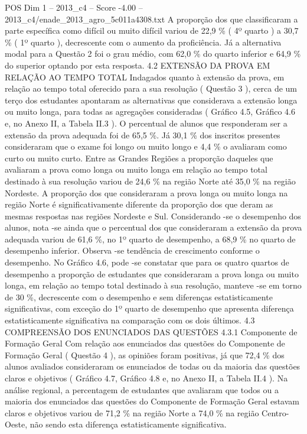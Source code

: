 \begin{textsample}{POS Dim 1 – 2013\_c4 – Score -4.00 – 2013\_c4/enade\_2013\_agro\_5c011a4308.txt}
A proporção dos que classificaram a parte específica como difícil ou muito difícil variou de 22,9 \% ( 4º quarto ) a 30,7 \% ( 1º quarto ), decrescente com o aumento da proficiência.
Já a alternativa modal para a Questão 2 foi o grau médio, com 62,0 \% do quarto inferior e 64,9 \% do superior optando por esta resposta. 4.2 EXTENSÃO DA PROVA EM RELAÇÃO AO TEMPO TOTAL Indagados quanto à extensão da prova, em relação ao tempo total oferecido para a sua resolução ( Questão 3 ), cerca de um terço dos estudantes apontaram as alternativas que considerava a extensão longa ou muito longa, para todas as agregações consideradas ( Gráfico 4.5, Gráfico 4.6 e, no Anexo II, a Tabela II.3 ).
O percentual de alunos que responderam ser a extensão da prova adequada foi de 65,5 \%.
Já 30,1 \% dos inscritos presentes consideraram que o exame foi longo ou muito longo e 4,4 \% o avaliaram como curto ou muito curto.
Entre as Grandes Regiões a proporção daqueles que avaliaram a prova como longa ou muito longa em relação ao tempo total destinado à sua resolução variou de 24,6 \% na região Norte até 35,0 \% na região Nordeste.
A proporção dos que consideraram a prova longa ou muito longa na região Norte é significativamente diferente da proporção dos que deram as mesmas respostas nas regiões Nordeste e Sul.
Considerando -se o desempenho dos alunos, nota -se ainda que o percentual dos que consideraram a extensão da prova adequada variou de 61,6 \%, no 1º quarto de desempenho, a 68,9 \% no quarto de desempenho inferior.
Observa -se tendência de crescimento conforme o desempenho.
No Gráfico 4.6, pode -se constatar que para os quatro quartos de desempenho a proporção de estudantes que consideraram a prova longa ou muito longa, em relação ao tempo total destinado à sua resolução, manteve -se em torno de 30 \%, decrescente com o desempenho e sem diferenças estatisticamente significativas, com exceção do 1º quarto de desempenho que apresenta diferença estatisticamente significativa na comparação com os dois últimos. 4.3 COMPREENSÃO DOS ENUNCIADOS DAS QUESTÕES 4.3.1 Componente de Formação Geral Com relação aos enunciados das questões do Componente de Formação Geral ( Questão 4 ), as opiniões foram positivas, já que 72,4 \% dos alunos avaliados consideraram os enunciados de todas ou da maioria das questões claros e objetivos ( Gráfico 4.7, Gráfico 4.8 e, no Anexo II, a Tabela II.4 ).
Na análise regional, a percentagem de estudantes que avaliaram que todos ou a maioria dos enunciados das questões do Componente de Formação Geral estavam claros e objetivos variou de 71,2 \% na região Norte a 74,0 \% na região Centro-Oeste, não sendo esta diferença estatisticamente significativa.

\end{textsample}
